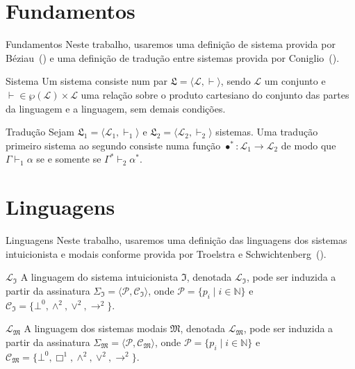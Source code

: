 \documentclass[table]{beamer}
\begin{document}
    \section[]{Fundamentos}
    \begin{frame}{Fundamentos}
        \justifying{}
        Neste trabalho, usaremos uma definição de sistema provida por Béziau~(\citeyear{Beziau}) e uma definição de tradução entre sistemas provida por Coniglio~(\citeyear{Coniglio}).
        \begin{block}{Sistema}
            \justifying{}
            Um sistema consiste num par $\mathfrak{L}=\langle\mathcal{L},{\vdash}\rangle$, sendo $\mathcal{L}$ um conjunto e ${\vdash}\in\wp(\mathcal{L})\times\mathcal{L}$ uma relação sobre o produto cartesiano do conjunto das partes da linguagem e a linguagem, sem demais condições.
        \end{block}

        \begin{block}{Tradução}
            \justifying{}
            Sejam $\mathfrak{L}_1=\langle\mathcal{L}_1,{\vdash_1}\rangle$ e $\mathfrak{L}_2=\langle\mathcal{L}_2,{\vdash}_2\rangle$ sistemas. Uma tradução primeiro sistema ao segundo consiste numa função $\bullet^*:\mathcal{L}_1\to\mathcal{L}_2$ de modo que $\Gamma\vdash_1\alpha$ se e somente se $\Gamma^*\vdash_2\alpha^*$.
        \end{block}
    \end{frame}

    \section[]{Linguagens}
    \begin{frame}{Linguagens}
        \justifying{}
        Neste trabalho, usaremos uma definição das linguagens dos sistemas intuicionista e modais conforme provida por Troelstra e Schwichtenberg~(\citeyear{Troelstra}).
        \begin{block}{$\mathcal{L}_\mathfrak{I}$}
            \justifying{}
            A linguagem do sistema intuicionista $\mathfrak{I}$, denotada $\mathcal{L}_\mathfrak{I}$, pode ser induzida a partir da assinatura $\Sigma_\mathfrak{I} = \langle\mathcal{P}, \mathcal{C}_\mathfrak{I}\rangle$, onde $\mathcal{P}=\{p_i\mid i\in\mathbb{N}\}$ e $\mathcal{C}_\mathfrak{I} = \{\bot^0, \wedge^2, \vee^2, \to^2\}$.
        \end{block}
        \begin{block}{$\mathcal{L}_\mathfrak{M}$}
            \justifying{}
            A linguagem dos sistemas modais $\mathfrak{M}$, denotada $\mathcal{L}_\mathfrak{M}$, pode ser induzida a partir da assinatura $\Sigma_\mathfrak{M} = \langle\mathcal{P}, \mathcal{C}_\mathfrak{M}\rangle$, onde $\mathcal{P}=\{p_i\mid i\in\mathbb{N}\}$ e $\mathcal{C}_\mathfrak{M} = \{\bot^0, \Box^1, \wedge^2, \vee^2, \to^2\}$.
        \end{block}
    \end{frame}
\end{document}
